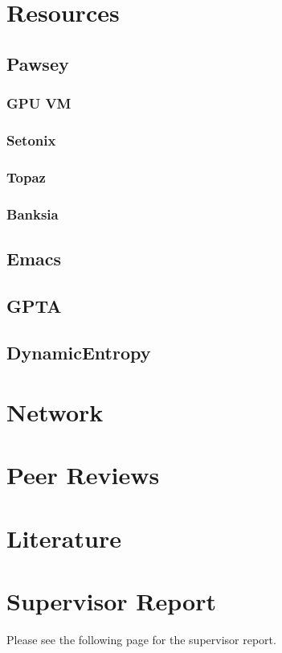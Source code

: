\documentclass[11pt]{article}
\begin{document}
\section{Resources}

\subsection{Pawsey}
\subsubsection{GPU VM}
\subsubsection{Setonix}
\subsubsection{Topaz}
\subsubsection{Banksia}

\subsection{Emacs}
\subsection{GPTA}
\subsection{DynamicEntropy}

\section{Network}

\section{Peer Reviews}

\section{Literature}




\appendix

\section{Supervisor Report}
\label{appendix:suprep}

Please see the following page for the supervisor report.


\end{document}
